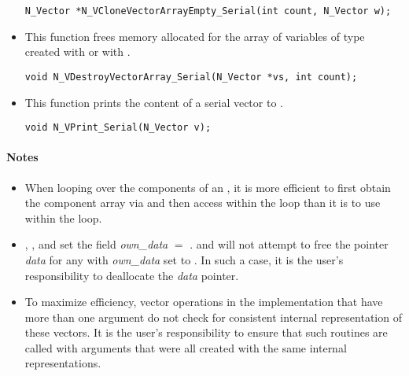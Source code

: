 \begin{itemize}
 

 \verb|N_Vector *N_VCloneVectorArrayEmpty_Serial(int count, N_Vector w);|


\item {}

 This function frees memory allocated for the array of  variables of type
  created with  or with
 .

 

 \verb|void N_VDestroyVectorArray_Serial(N_Vector *vs, int count);|


\item {}

 This function prints the content of a serial vector to .

 
 
 \verb|void N_VPrint_Serial(N_Vector v);|

\end{itemize}
\paragraph{\bf Notes}                                                      
           
\begin{itemize}
                                        
\item
  When looping over the components of an  , it is     
  more efficient to first obtain the component array via       
   and then access  within the     
  loop than it is to use  within the loop.        

\item
  {\warn}, , 
  and  set the field 
  {\em own\_data} $=$ . 
   and 
  will not attempt to free the pointer {\em data} for any  with
  {\em own\_data} set to . In such a case, it is the user's responsibility to
  deallocate the {\em data} pointer.
                                     
\item
  {\warn}To maximize efficiency, vector operations in the {\nvecs} implementation
  that have more than one  argument do not check for
  consistent internal representation of these vectors. It is the user's 
  responsibility to ensure that such routines are called with 
  arguments that were all created with the same internal representations.

\end{itemize}

